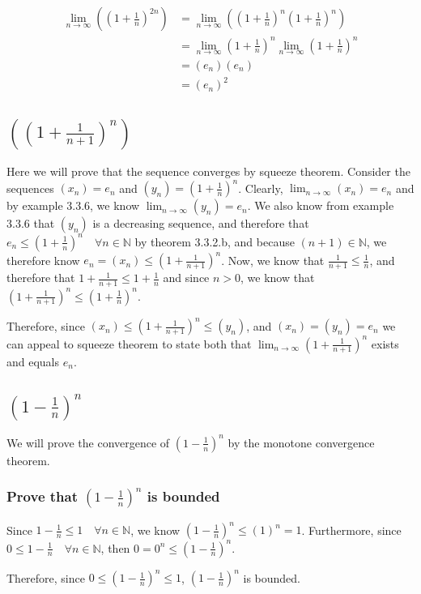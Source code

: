 \documentclass{article}
\begin{document}
\begin{align*}
	\lim_{n\to\infty}((1+\frac{1}{n})^{2n}) &= \lim_{n\to\infty}((1+\frac{1}{n})^n(1+\frac{1}{n})^n) \\
	&= \lim_{n\to\infty}(1+\frac{1}{n})^n\lim_{n\to\infty}(1+\frac{1}{n})^n \\
	&= (e_n)(e_n) \\
	&= (e_n)^2
\end{align*}

\subsection{$((1+\frac{1}{n+1})^{n})$}

Here we will prove that the sequence converges by squeeze theorem. Consider the sequences $(x_n) = e_n$ and $(y_n) = (1 + \frac{1}{n})^n$. Clearly, $\lim_{n\to\infty}(x_n) = e_n$ and by example 3.3.6, we know $\lim_{n\to\infty}(y_n) = e_n$. We also know from example 3.3.6 that $(y_n)$ is a decreasing sequence, and therefore that $e_n \le (1+\frac{1}{n})^{n} \quad \forall n \in \mathbb{N}$ by theorem 3.3.2.b, and because $(n+1) \in \mathbb{N}$, we therefore know $e_n = (x_n) \le (1+\frac{1}{n+1})^{n}$. Now, we know that $\frac{1}{n+1} \le \frac{1}{n}$, and therefore that $1 + \frac{1}{n+1} \le 1 + \frac{1}{n}$ and since $n > 0$, we know that $(1 + \frac{1}{n+1})^n \le (1 + \frac{1}{n})^n$.

Therefore, since $(x_n) \le (1+\frac{1}{n+1})^{n} \le (y_n)$, and $(x_n) = (y_n) = e_n$ we can appeal to squeeze theorem to state both that $\lim_{n\to\infty}(1+\frac{1}{n+1})^{n}$ exists and equals $e_n$.

\subsection{$(1 - \frac{1}{n})^n$}

We will prove the convergence of $(1 - \frac{1}{n})^n$ by the monotone convergence theorem.

\subsubsection{Prove that $(1 - \frac{1}{n})^n$ is bounded}

Since $1 - \frac{1}{n} \le 1 \quad \forall n \in \mathbb{N}$, we know $(1 - \frac{1}{n})^n \le (1)^n = 1$. Furthermore, since $0 \le 1 - \frac{1}{n} \quad \forall n \in \mathbb{N}$, then $0 = 0^n \le (1 - \frac{1}{n})^n$.

Therefore, since $0 \le (1 - \frac{1}{n})^n \le 1$, $(1 - \frac{1}{n})^n$ is bounded.
\end{document}
